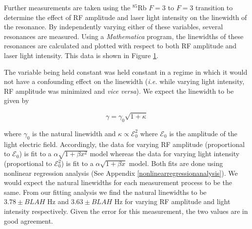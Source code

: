 Further measurements are taken using the $^{85}$Rb $F=3$ to $F=3$ transition to determine the effect of RF amplitude and laser light intensity on the linewidth of the resonance. By independently varying either of these variables, several resonances are measured.  Using a \emph{Mathematica} program, the linewidths of these resonances are calculated and plotted with respect to both RF amplitude and laser light intensity.  This data is shown in Figure \ref{fig:linewidths}.
\begin{figure}[h!]
\begin{center}
\hspace{-1mm}
\vspace{-2mm}
\vspace{-2mm}
\caption{\small{}}
\label{fig:linewidths}
\end{center}
\end{figure}
The variable being held constant was held constant in a regime in which it would not have a confounding effect on the linewidth (\emph{i.e.} while varying light intensity, RF amplitude was minimized and \emph{vice versa}).  We expect the linewidth to be given by 
\begin{center}
\begin{equation}\label{linewidth}
\gamma=\gamma_0\sqrt{1+\kappa}
\end{equation}
\end{center}
where $\gamma_0$ is the natural linewidth and $\kappa \propto \mathcal E_0^{2}$ where $\mathcal E_0$ is the amplitude of the light electric field.  Accordingly, the data for varying RF amplitude (proportional to $\mathcal E_0$) is fit to a $\alpha \sqrt{1+\beta x^2}$ model whereas the data for varying light intensity (proportional to $\mathcal E_0^{2}$) is fit to a $\alpha \sqrt{1+\beta x}$ model.  Both fits are done using nonlinear regression analysis (See Appendix \ref{nonlinearregressionanalysis}).  We would expect the natural linewidths for each measurement process to be the same.  From our fitting analysis we find the natural linewidths to be $3.78 \pm BLAH$ Hz and $3.63 \pm BLAH$ Hz for varying RF amplitude and light intensity respectively.  Given the error for this measurement, the two values are in good agreement. 

